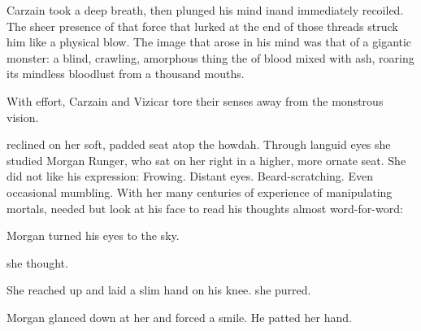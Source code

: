 
Carzain took a deep breath, then plunged his mind in\prikker and immediately recoiled. 
The sheer presence of that force that lurked at the end of those threads struck him like a physical blow.
The image that arose in his mind was that of a gigantic monster: 
a blind, crawling, amorphous thing the \colour of blood mixed with ash, roaring its mindless bloodlust from a thousand mouths. 

With effort, Carzain and Vizicar tore their senses away from the monstrous vision. 









\begin{comment}
\section{\Takestsha}
\end{comment}

\Takestsha{} reclined on her soft, padded seat atop the \mulgron{} howdah. 
Through languid eyes she studied Morgan Runger, who sat on her right in a higher, more ornate seat. 
She did not like his expression: 
Frowing. 
Distant eyes. 
Beard-scratching. 
Even occasional mumbling. 
With her many centuries of experience of manipulating mortals, \Takestsha needed but look at his face to read his thoughts almost word-for-word: 

  
Morgan turned his eyes to the sky.

 she thought. 

She reached up and laid a slim hand on his knee.
 she purred. 

Morgan glanced down at her and forced a smile. 
He patted her hand. 

